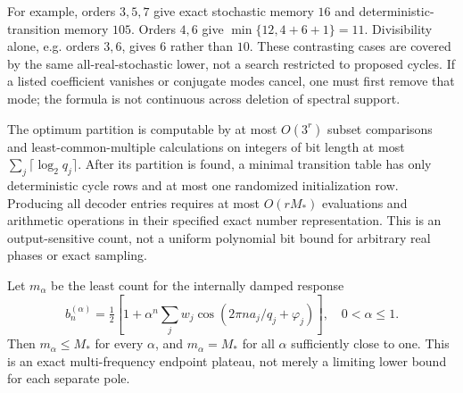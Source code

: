 For example, orders $3,5,7$ give exact stochastic memory $16$ and deterministic-transition memory $105$. Orders $4,6$ give $\min\{12,4+6+1\}=11$. Divisibility alone, e.g. orders $3,6$, gives $6$ rather than $10$. These contrasting cases are covered by the same all-real-stochastic lower, not a search restricted to proposed cycles. If a listed coefficient vanishes or conjugate modes cancel, one must first remove that mode; the formula is not continuous across deletion of spectral support.

\begin{corollary}\label{cor:r72-synthesis}
The optimum partition is computable by at most $O(3^r)$ subset comparisons and least-common-multiple calculations on integers of bit length at most $\sum_j\lceil\log_2q_j\rceil$. After its partition is found, a minimal transition table has only deterministic cycle rows and at most one randomized initialization row. Producing all decoder entries requires at most $O(rM_*)$ evaluations and arithmetic operations in their specified exact number representation. This is an output-sensitive count, not a uniform polynomial bit bound for arbitrary real phases or exact sampling.

Let $m_\alpha$ be the least count for the internally damped response
\[
 b_n^{(\alpha)}=\tfrac12\left[1+\alpha^n\sum_jw_j
               \cos(2\pi n a_j/q_j+\varphi_j)\right],\quad0<\alpha\le1.
\]
Then $m_\alpha\le M_*$ for every $\alpha$, and $m_\alpha=M_*$ for all $\alpha$ sufficiently close to one. This is an exact multi-frequency endpoint plateau, not merely a limiting lower bound for each separate pole.
\end{corollary}
